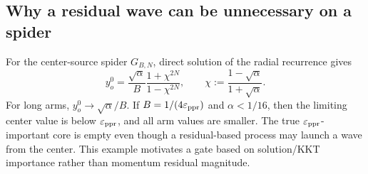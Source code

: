 \subsection{Why a residual wave can be unnecessary on a spider}

For the center-source spider $G_{B,N}$, direct solution of the radial
recurrence gives
\begin{equation}
  y_o^0
  =\frac{\sqrt\alpha}{B}
    \frac{1+\chi^{2N}}{1-\chi^{2N}},
  \qquad
  \chi:=\frac{1-\sqrt\alpha}{1+\sqrt\alpha}.
  \label{eq:spider-center-value}
\end{equation}
For long arms, $y_o^0\to\sqrt\alpha/B$.  If
$B=1/(4\varepsilon_{\mathrm{ppr}})$ and $\alpha<1/16$, then the limiting center value is below
$\varepsilon_{\mathrm{ppr}}$, and all arm values are smaller.  The true $\varepsilon_{\mathrm{ppr}}$-important
core is empty even though a residual-based process may launch a wave from the
center.  This example motivates a gate based on solution/KKT importance rather
than momentum residual magnitude.
